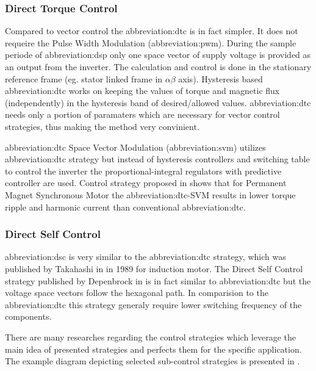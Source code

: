 \documentclass[a4paper, twoside, 11pt]{article}
\begin{document}
        \subsubsection{Direct Torque Control}
            Compared to vector control the \gls{abbreviation:dtc} is in fact simpler. It does not requeire the Pulse Width Modulation (\gls{abbreviation:pwm}). During the sample periode of \gls{abbreviation:dsp} only one space vector of supply voltage is provided as an output from the inverter. The calculation and control is done in the stationary reference frame (eg. stator linked frame in $\alpha \beta$ axis). Hysteresis based \gls{abbreviation:dtc} works on keeping the values of torque and magnetic flux (independently) in the hysteresis band of desired/allowed values. \gls{abbreviation:dtc} needs only a portion of paramaters which are necessary for vector control strategies, thus making the method very convinient. \cite{dwivedi-review-on-control-strategies-of-permanent-magnet-assisted-synchronous-reluctance-motor-drive}\par
            \gls{abbreviation:dtc} Space Vector Modulation (\gls{abbreviation:svm}) utilizes \gls{abbreviation:dtc} strategy but instead of hysteresis controllers and switching table to control the inverter the proportional-integral regulators with predictive controller are used. Control strategy proposed in \cite{swierczynski-dsp-based-direct-torque-control-of-permanent-magnet-synchronous-motor-using-space-vector-modulation-dtcsvm} shows that for Permanent Magnet Synchronous Motor the \gls{abbreviation:dtc}-SVM results in lower torque ripple and harmonic current than conventional \gls{abbreviation:dtc}.

        \subsubsection{Direct Self Control}
            \gls{abbreviation:dsc} is very similar to the \gls{abbreviation:dtc} strategy, which was published by Takahashi in \cite{takahashi-high-performance-direct-torque-control-of-an-iduction-motor} in 1989 for induction motor. The Direct Self Control strategy published by Depenbrock in \cite{depenbrock-direct-self-control-of-inverter-fed-induction-machine} is in fact similar to \gls{abbreviation:dtc} but the voltage space vectors follow the hexagonal path. In comparision to the \gls{abbreviation:dtc} this strategy generaly require lower switching frequency of the components.

        \par
        There are many researches regarding the control strategies which leverage the main idea of presented strategies and perfects them for the specific application. The example diagram depicting selected sub-control strategies is presented in \cite{heidari-a-review-of-synchronour-relucatence-motor-drive-advancements}.
\end{document}
